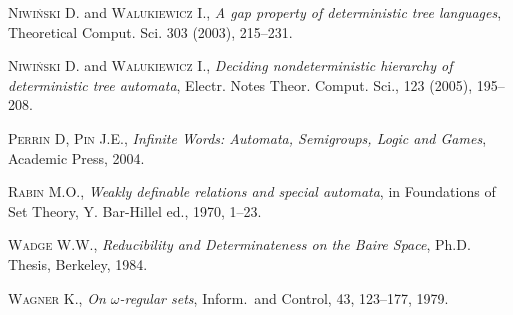 \begin{thebibliography}{00}
\textsc{Niwiński} D. and \textsc{Walukiewicz} I., \emph{A gap property of deterministic tree languages}, Theoretical Comput. Sci. \textsc{303} (2003), 215--231.

\textsc{Niwiński} D. and \textsc{Walukiewicz} I., \emph{Deciding nondeterministic hierarchy of deterministic tree automata},
Electr. Notes Theor. Comput. Sci., \textsc{123} (2005), 195--208.


\textsc{Perrin} D, \textsc{Pin} J.E., \emph{Infinite Words: Automata, Semigroups, Logic and Games}, Academic Press, \textsc{2004}.

\textsc{Rabin} M.O., \emph{Weakly definable relations and special automata}, in Foundations of Set Theory, Y. Bar-Hillel ed., \textsc{1970}, 1--23.

\textsc{Wadge} W.W., \emph{Reducibility and Determinateness on the Baire Space}, Ph.D. Thesis, Berkeley, \textsc{1984}.

\textsc{Wagner} K., \emph{On $\omega$-regular sets}, Inform.~and Control, \textsc{43}, 123--177, 1979. 

\end{thebibliography}
